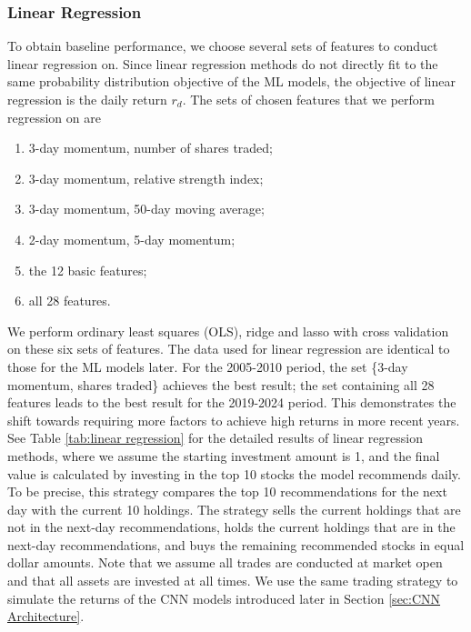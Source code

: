 \documentclass[preprint,12pt,numafflabel,authoryear]{elsarticle}
\begin{document}
\subsubsection{Linear Regression}
\label{sec:Linear Regression}
To obtain baseline performance, we choose several sets of features to conduct linear regression on. Since linear regression methods do not directly fit to the same probability distribution objective of the ML models, the objective of linear regression is the daily return $r_d$. The sets of chosen features that we perform regression on are
\begin{enumerate}
\item 3-day momentum, number of shares traded;
\item 3-day momentum, relative strength index;
\item 3-day momentum, 50-day moving average;
\item 2-day momentum, 5-day momentum;
\item the 12 basic features;
\item all 28 features.
\end{enumerate}

We perform ordinary least squares (OLS), ridge and lasso with cross validation on these six sets of features. The data used for linear regression are identical to those for the ML models later. For the 2005-2010 period, the set \{3-day momentum, shares traded\} achieves the best result; the set containing all 28 features leads to the best result for the 2019-2024 period. This demonstrates the shift towards requiring more factors to achieve high returns in more recent years. See Table \ref{tab:linear regression} for the detailed results of linear regression methods, where we assume the starting investment amount is 1, and the final value is calculated by investing in the top 10 stocks the model recommends daily. To be precise, this strategy compares the top 10 recommendations for the next day with the current 10 holdings. The strategy sells the current holdings that are not in the next-day recommendations, holds the current holdings that are in the next-day recommendations, and buys the remaining recommended stocks in equal dollar amounts. Note that we assume all trades are conducted at market open and that all assets are invested at all times. We use the same trading strategy to simulate the returns of the CNN models introduced later in Section \ref{sec:CNN Architecture}.
\end{document}
